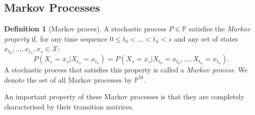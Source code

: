 \documentclass[10pt]{paper}
\theoremstyle{definition}
\newtheorem{corollary}[theorem]{Corollary}
\newtheorem{definition}{Definition}
\newcommand{\reals}{\mathbb{R}}
\newcommand{\realspos}{\reals_{>0}}
\newcommand{\realsnonneg}{\reals_{\geq 0}}
\newcommand{\states}{\mathcal{X}}
\newcommand{\processes}{\mathbb{P}}
\newcommand{\mprocesses}{\processes^{\mathrm{M}}}
\newcommand{\norm}[1]{\left\lVert #1 \right\rVert}
\begin{document}
%

\subsection{Markov Processes}

\begin{definition}[Markov proces]\label{def:markov_property}
A stochastic process $P\in\processes$ satisfies the \emph{Markov property} if, for any time sequence $0\leq t_0<\dots<t_{n}<s$ and any set of states $x_{t_0},\dots,x_{t_n},x_s\in\states$:
\begin{equation*}
P(X_s=x_s\vert X_{t_n}=x_{t_n})=P(X_s=x_s\vert X_{t_0}=x_{t_0}, \dots, X_{t_n}=x_{t_n}).
\end{equation*}
A stochastic process that satisfies this property is called a \emph{Markov process}. We denote the set of all Markov processes by $\mprocesses$.
\end{definition}

An important property of these Markov processes is that they are completely characterised by their transition matrices.
\end{document}
